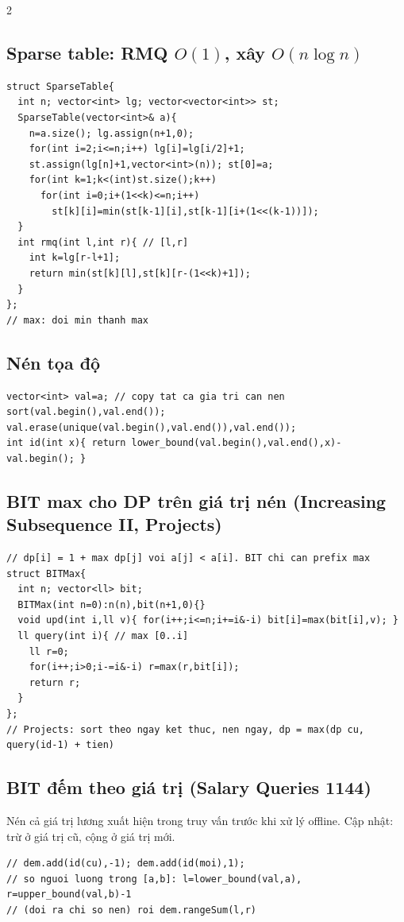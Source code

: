 \documentclass[8pt]{extarticle}
\begin{document}
\begin{multicols}{2}
\subsection{Sparse table: RMQ $O(1)$, xây $O(n\log n)$}
\begin{lstlisting}
struct SparseTable{
  int n; vector<int> lg; vector<vector<int>> st;
  SparseTable(vector<int>& a){
    n=a.size(); lg.assign(n+1,0);
    for(int i=2;i<=n;i++) lg[i]=lg[i/2]+1;
    st.assign(lg[n]+1,vector<int>(n)); st[0]=a;
    for(int k=1;k<(int)st.size();k++)
      for(int i=0;i+(1<<k)<=n;i++)
        st[k][i]=min(st[k-1][i],st[k-1][i+(1<<(k-1))]);
  }
  int rmq(int l,int r){ // [l,r]
    int k=lg[r-l+1];
    return min(st[k][l],st[k][r-(1<<k)+1]);
  }
};
// max: doi min thanh max
\end{lstlisting}

\subsection{Nén tọa độ}
\begin{lstlisting}
vector<int> val=a; // copy tat ca gia tri can nen
sort(val.begin(),val.end());
val.erase(unique(val.begin(),val.end()),val.end());
int id(int x){ return lower_bound(val.begin(),val.end(),x)-val.begin(); }
\end{lstlisting}

\subsection{BIT max cho DP trên giá trị nén (Increasing Subsequence II, Projects)}
\begin{lstlisting}
// dp[i] = 1 + max dp[j] voi a[j] < a[i]. BIT chi can prefix max
struct BITMax{
  int n; vector<ll> bit;
  BITMax(int n=0):n(n),bit(n+1,0){}
  void upd(int i,ll v){ for(i++;i<=n;i+=i&-i) bit[i]=max(bit[i],v); }
  ll query(int i){ // max [0..i]
    ll r=0;
    for(i++;i>0;i-=i&-i) r=max(r,bit[i]);
    return r;
  }
};
// Projects: sort theo ngay ket thuc, nen ngay, dp = max(dp cu, query(id-1) + tien)
\end{lstlisting}

\subsection{BIT đếm theo giá trị (Salary Queries 1144)}
Nén cả giá trị lương xuất hiện trong truy vấn trước khi xử lý offline. Cập nhật: trừ ở giá trị cũ, cộng ở giá trị mới.
\begin{lstlisting}
// dem.add(id(cu),-1); dem.add(id(moi),1);
// so nguoi luong trong [a,b]: l=lower_bound(val,a), r=upper_bound(val,b)-1
// (doi ra chi so nen) roi dem.rangeSum(l,r)
\end{lstlisting}


\end{multicols}
\end{document}
